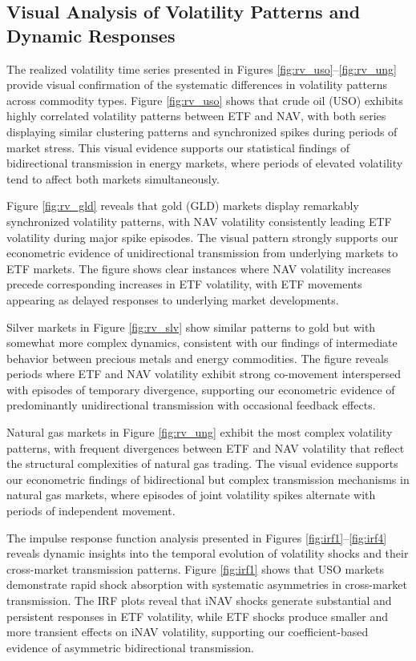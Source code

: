 \subsection{Visual Analysis of Volatility Patterns and Dynamic Responses}

The realized volatility time series presented in Figures \ref{fig:rv_uso}--\ref{fig:rv_ung} provide visual confirmation of the systematic differences in volatility patterns across commodity types. Figure \ref{fig:rv_uso} shows that crude oil (USO) exhibits highly correlated volatility patterns between ETF and NAV, with both series displaying similar clustering patterns and synchronized spikes during periods of market stress. This visual evidence supports our statistical findings of bidirectional transmission in energy markets, where periods of elevated volatility tend to affect both markets simultaneously.

Figure \ref{fig:rv_gld} reveals that gold (GLD) markets display remarkably synchronized volatility patterns, with NAV volatility consistently leading ETF volatility during major spike episodes. The visual pattern strongly supports our econometric evidence of unidirectional transmission from underlying markets to ETF markets. The figure shows clear instances where NAV volatility increases precede corresponding increases in ETF volatility, with ETF movements appearing as delayed responses to underlying market developments.

Silver markets in Figure \ref{fig:rv_slv} show similar patterns to gold but with somewhat more complex dynamics, consistent with our findings of intermediate behavior between precious metals and energy commodities. The figure reveals periods where ETF and NAV volatility exhibit strong co-movement interspersed with episodes of temporary divergence, supporting our econometric evidence of predominantly unidirectional transmission with occasional feedback effects.

Natural gas markets in Figure \ref{fig:rv_ung} exhibit the most complex volatility patterns, with frequent divergences between ETF and NAV volatility that reflect the structural complexities of natural gas trading. The visual evidence supports our econometric findings of bidirectional but complex transmission mechanisms in natural gas markets, where episodes of joint volatility spikes alternate with periods of independent movement.

The impulse response function analysis presented in Figures \ref{fig:irf1}--\ref{fig:irf4} reveals dynamic insights into the temporal evolution of volatility shocks and their cross-market transmission patterns. Figure \ref{fig:irf1} shows that USO markets demonstrate rapid shock absorption with systematic asymmetries in cross-market transmission. The IRF plots reveal that iNAV shocks generate substantial and persistent responses in ETF volatility, while ETF shocks produce smaller and more transient effects on iNAV volatility, supporting our coefficient-based evidence of asymmetric bidirectional transmission.

